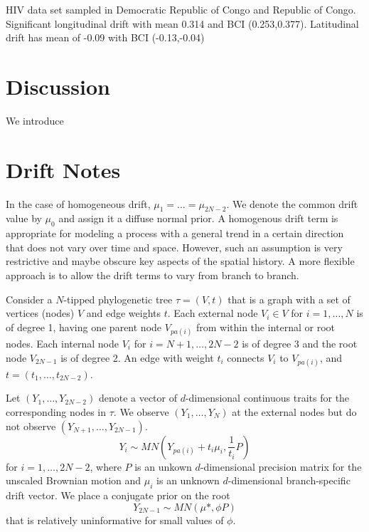 \documentclass[12pt]{article}
\begin{document}
HIV data set sampled in Democratic Republic of Congo and Republic of Congo.  Significant longitudinal drift
with mean 0.314 and BCI (0.253,0.377).  Latitudinal drift has mean of -0.09 with BCI (-0.13,-0.04)


\section{Discussion} 

We introduce


\section{Drift Notes}

In the case of homogeneous drift, $\mu_1 = \dots = \mu_{2N-2}$.  We denote the common drift value by $\mu_0$ and assign it
a diffuse normal prior.  A homogenous drift term is appropriate for modeling a process with a general trend in a certain direction
that does not vary over time and space.  However, such an assumption is very restrictive and maybe obscure key aspects of the spatial
history.  A more flexible approach is to allow the drift terms to vary from branch to branch.  
\par
Consider a $N$-tipped phylogenetic tree $\tau = (V,t)$ that is a graph with a set of vertices (nodes)
$V$ and edge weights $t$.  Each external node $V_i \in V$ for $i = 1, \dots , N$ is of degree 1, having one
parent node $V_{pa(i)}$ from within the internal or root nodes.  Each internal node $V_i$ for $i = N+1, \dots , 2N-2$ 
is of degree 3 and the root node $V_{2N-1}$ is of degree 2.  An edge with weight $t_i$ connects $V_i$ to
$V_{pa(i)}$, and $t = (t_1, \dots, t_{2N-2})$.
\par
Let $(Y_1,\dots,Y_{2N-2})$ denote a vector of $d$-dimensional continuous traits for the corresponding 
nodes in $\tau$.  We observe $(Y_1,\dots,Y_N)$ at the external nodes but do not observe $(Y_{N+1},\dots,Y_{2N-1})$.
\begin{equation}
Y_i \sim MN \left( Y_{pa(i)} + t_i \mu_i, \frac{1}{t_i}P \right)
\end{equation}
for $i = 1, \dots, 2N-2$, where $P$ is an unkown $d$-dimensional precision matrix for the unscaled Brownian 
motion and $\mu_i$ is an unknown $d$-dimensional branch-specific drift vector.  We place a conjugate prior on the root 
\begin{equation}
Y_{2N-1} \sim MN \left(\mu*, \phi P \right)
\end{equation}
that is relatively uninformative for small values of $\phi$.  
\end{document}
